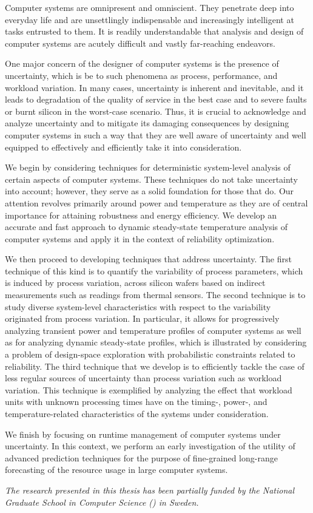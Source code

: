 Computer systems are omnipresent and omniscient. They penetrate deep into
everyday life and are unsettlingly indispensable and increasingly intelligent at
tasks entrusted to them. It is readily understandable that analysis and design
of computer systems are acutely difficult and vastly far-reaching endeavors.

One major concern of the designer of computer systems is the presence of
uncertainty, which is be to such phenomena as process, performance, and workload
variation. In many cases, uncertainty is inherent and inevitable, and it leads
to degradation of the quality of service in the best case and to severe faults
or burnt silicon in the worst-case scenario. Thus, it is crucial to acknowledge
and analyze uncertainty and to mitigate its damaging consequences by designing
computer systems in such a way that they are well aware of uncertainty and well
equipped to effectively and efficiently take it into consideration.

We begin by considering techniques for deterministic system-level analysis of
certain aspects of computer systems. These techniques do not take uncertainty
into account; however, they serve as a solid foundation for those that do. Our
attention revolves primarily around power and temperature as they are of central
importance for attaining robustness and energy efficiency. We develop an
accurate and fast approach to dynamic steady-state temperature analysis of
computer systems and apply it in the context of reliability optimization.

We then proceed to developing techniques that address uncertainty. The first
technique of this kind is to quantify the variability of process parameters,
which is induced by process variation, across silicon wafers based on indirect
measurements such as readings from thermal sensors. The second technique is to
study diverse system-level characteristics with respect to the variability
originated from process variation. In particular, it allows for progressively
analyzing transient power and temperature profiles of computer systems as well
as for analyzing dynamic steady-state profiles, which is illustrated by
considering a problem of design-space exploration with probabilistic constraints
related to reliability. The third technique that we develop is to efficiently
tackle the case of less regular sources of uncertainty than process variation
such as workload variation. This technique is exemplified by analyzing the
effect that workload units with unknown processing times have on the timing-,
power-, and temperature-related characteristics of the systems under
consideration.

We finish by focusing on runtime management of computer systems under
uncertainty. In this context, we perform an early investigation of the utility
of advanced prediction techniques for the purpose of fine-grained long-range
forecasting of the resource usage in large computer systems.

\vspace{1em}
\noindent
\emph{The research presented in this thesis has been partially funded by the
National Graduate School in Computer Science () in Sweden.}
